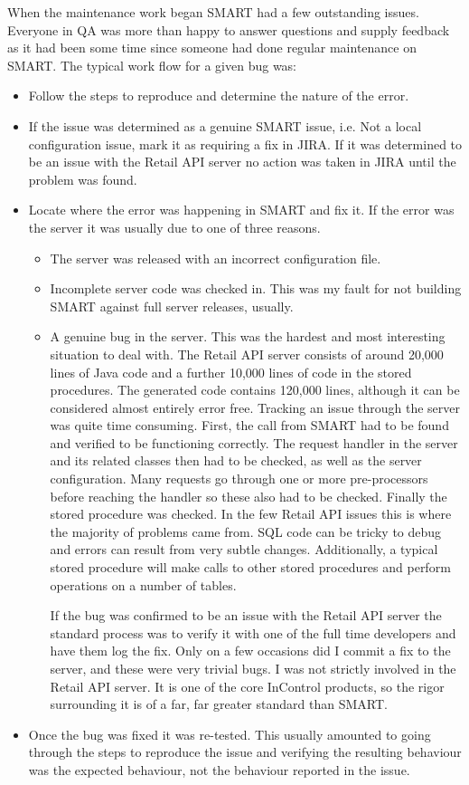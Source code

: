 \documentclass[a4paper, 11pt, titlepage]{article}
\begin{document}
When the maintenance work began SMART had a few outstanding issues. Everyone in QA was more than happy to answer questions and supply feedback as it had been some time since someone had done regular maintenance on SMART. 
The typical work flow for a given bug was:
\begin{itemize} 
\item Follow the steps to reproduce and determine the nature of the error. 
\item If the issue was determined as a genuine SMART issue, i.e. Not a local configuration issue, mark it as requiring a fix in JIRA. If it was determined to be an issue with the Retail API server no action was taken in JIRA until the problem was found. 
\item Locate where the error was happening in SMART and fix it. If the error was the server it was usually due to one of three reasons. 
\begin{itemize} 
\item The server was released with an incorrect configuration file. 
\item Incomplete server code was checked in. This was my fault for not building SMART against full server releases, usually. 
\item A genuine bug in the server. This was the hardest and most interesting situation to deal with. The Retail API server consists of around 20,000 lines of Java code and a further 10,000 lines of code in the stored procedures. The generated code contains 120,000 lines, although it can be considered almost entirely error free. Tracking an issue through the server was quite time consuming. First, the call from SMART had to be found and verified to be functioning correctly. The request handler in the server and its related classes then had to be checked, as well as the server configuration. Many requests go through one or more pre-processors before reaching the handler so these also had to be checked. Finally the stored procedure was checked. In the few Retail API issues this is where the majority of problems came from. SQL code can be tricky to debug and errors can result from very subtle changes. Additionally, a typical stored procedure will make calls to other stored procedures and perform operations on a number of tables. 
 
If the bug was confirmed to be an issue with the Retail API server the standard process was to verify it with one of the full time developers and have them log the fix. Only on a few occasions did I commit a fix to the server, and these were very trivial bugs. I was not strictly involved in the Retail API server. It is one of the core InControl products, so the rigor surrounding it is of a far, far greater standard than SMART. 
\end{itemize} 
\item Once the bug was fixed it was re-tested. This usually amounted to going through the steps to reproduce the issue and verifying the resulting behaviour was the expected behaviour, not the behaviour reported in the issue. 
\end{itemize} 
\end{document}
